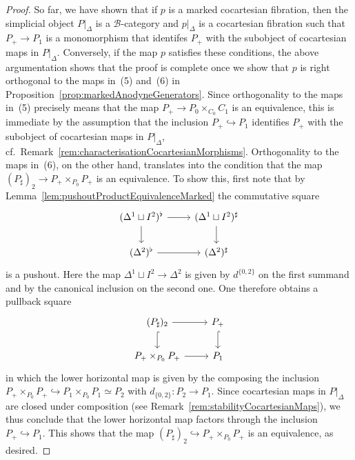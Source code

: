 \documentclass[reqno]{amsart}
\numberwithin{equation}{subsection}
\theoremstyle{plain}
\theoremstyle{definition}
\let\scr=\mathcal
\let\into=\hookrightarrow
\def\BB{\scr B}
\begin{document}
\begin{proof}
	So far, we have shown that if $p$ is a marked cocartesian fibration, then the simplicial object $P\vert_{\Delta}$ is a $\BB$-category and $p\vert_{\Delta}$ is a cocartesian fibration such that $P_+\to  P_1$ is a monomorphism that identifes $P_+$ with the subobject of cocartesian maps in $P\vert_{\Delta}$. Conversely, if the map $p$ satisfies these conditions, the above argumentation shows that the proof is complete once we show that $p$ is right orthogonal to the maps in~(5) and~(6) in Proposition~\ref{prop:markedAnodyneGenerators}. Since orthogonality to the maps in~(5)
	precisely means that the map $P_+\to P_0\times_{C_0}C_1$ is an equivalence, this is immediate by the assumption that the inclusion $P_+\into P_1$ identifies $P_+$ with the subobject of cocartesian maps in $P\vert_{\Delta}$, cf.\ Remark~\ref{rem:characterisationCocartesianMorphisms}. Orthogonality to the maps in~(6), on the other hand, translates into the condition that the map $(P_\sharp)_2\to P_+\times_{P_0}P_+$ is an equivalence. To show this, first note that by Lemma~\ref{lem:pushoutProductEquivalenceMarked} the commutative square
	\begin{equation*}
	\begin{tikzcd}
	(\Delta^1\sqcup I^2)^\flat\arrow[r]\arrow[d] & (\Delta^1\sqcup I^2)^\sharp\arrow[d]\\
	(\Delta^2)^\flat\arrow[r] & (\Delta^2)^\sharp 
	\end{tikzcd}
	\end{equation*}
	is a pushout. Here the map $\Delta^1\sqcup I^2\to \Delta^2$ is given by $d^{\{0,2\}}$ on the first summand and by the canonical inclusion on the second one. One therefore obtains a pullback square
	\begin{equation*}
	\begin{tikzcd}
	(P_\sharp)_2\arrow[r]\arrow[d, hookrightarrow] & P_+\arrow[d, hookrightarrow]\\
	P_+\times_{P_0}P_+\arrow[r] &P_1
	\end{tikzcd}
	\end{equation*}
	in which the lower horizontal map is given by the composing the inclusion $P_+\times_{P_0}P_+\into P_1\times_{P_0}P_1\simeq P_2$ with $d_{\{0,2\}}\colon P_2\to P_1$. Since cocartesian maps in $P\vert_{\Delta}$ are closed under composition (see Remark~\ref{rem:stabilityCocartesianMaps}), we thus conclude that the lower horizontal map factors through the inclusion $P_+\into P_1$. This shows that the map $(P_\sharp)_2\into P_+\times_{P_0}P_+$ is an equivalence, as desired.
\end{proof}
\end{document}
